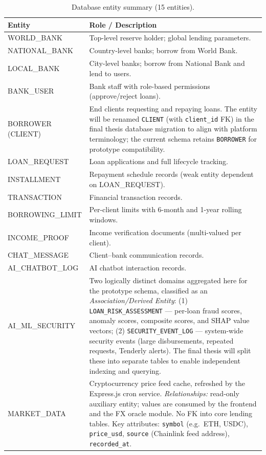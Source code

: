\documentclass[12pt,a4paper]{report}
\begin{document}
\begin{table}[H]
\centering
\caption{Database entity summary (15 entities).}
\label{tab:db-entities}
\begin{tabular}{p{4cm}p{9.5cm}}
\hline
\textbf{Entity} & \textbf{Role / Description} \\
\hline
WORLD\_BANK & Top-level reserve holder; global lending parameters. \\
NATIONAL\_BANK & Country-level banks; borrow from World Bank. \\
LOCAL\_BANK & City-level banks; borrow from National Bank and lend to users. \\
BANK\_USER & Bank staff with role-based permissions (approve/reject loans). \\
BORROWER (CLIENT) & End clients requesting and repaying loans. The entity will be renamed \texttt{CLIENT} (with \texttt{client\_id} FK) in the final thesis database migration to align with platform terminology; the current schema retains \texttt{BORROWER} for prototype compatibility. \\
LOAN\_REQUEST & Loan applications and full lifecycle tracking. \\
INSTALLMENT & Repayment schedule records (weak entity dependent on LOAN\_REQUEST). \\
TRANSACTION & Financial transaction records. \\
BORROWING\_LIMIT & Per-client limits with 6-month and 1-year rolling windows. \\
INCOME\_PROOF & Income verification documents (multi-valued per client). \\
CHAT\_MESSAGE & Client--bank communication records. \\
AI\_CHATBOT\_LOG & AI chatbot interaction records. \\
AI\_ML\_SECURITY & Two logically distinct domains aggregated here for the prototype schema, classified as an \textit{Association/Derived Entity}: (1) \texttt{LOAN\_RISK\_ASSESSMENT} --- per-loan fraud scores, anomaly scores, composite scores, and SHAP value vectors; (2) \texttt{SECURITY\_EVENT\_LOG} --- system-wide security events (large disbursements, repeated requests, Tenderly alerts). The final thesis will split these into separate tables to enable independent indexing and querying. \\
MARKET\_DATA & Cryptocurrency price feed cache, refreshed by the Express.js cron service. \textit{Relationships:} read-only auxiliary entity; values are consumed by the frontend and the FX oracle module. No FK into core lending tables. Key attributes: \texttt{symbol} (e.g.\ ETH, USDC), \texttt{price\_usd}, \texttt{source} (Chainlink feed address), \texttt{recorded\_at}. \\

\end{tabular}
\end{table}
\end{document}
